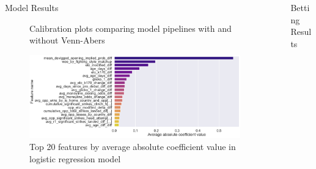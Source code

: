\documentclass[final]{beamer}
\newlength{\sepwidth}
\newlength{\colwidth}
\newcommand{\separatorcolumn}{\begin{column}{\sepwidth}\end{column}}
\begin{document}
\begin{frame}[t]
\begin{columns}[t]
\begin{column}{\colwidth}
\begin{block}{Model Results}
\begin{figure}
\begin{subfigure}{.24\linewidth}
        \end{subfigure}
        \caption{Calibration plots comparing model pipelines with and without Venn-Abers}
    \end{figure}
    \vspace{-20pt}
    \begin{figure}
        \centering
        \includegraphics[width=0.6\linewidth]{figures/lr_feature_avg_abs_coef.png}
        \caption{Top 20 features by average absolute coefficient value in logistic regression model}
    \end{figure}
    

  \end{block}

\end{column}

\separatorcolumn

\begin{column}{\colwidth}
  \vspace{-30pt}
  \begin{block}{Betting Results}


\end{block}
\end{column}
\end{columns}
\end{frame}
\end{document}
